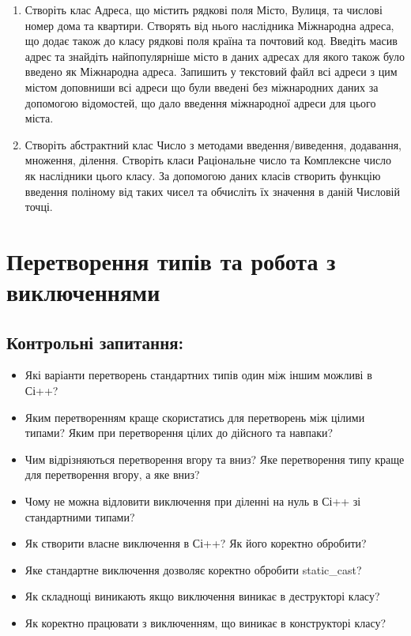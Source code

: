 \documentclass[a5paper,titlepage,openany,twoside,draft]{book_unv}%
\begin{document}
\begin{enumerate}
\item
Створіть клас Адреса, що містить рядкові поля Місто, Вулиця, та числові номер дома та квартири. 
Створять від нього наслідника Міжнародна адреса, що додає також до класу рядкові поля країна та почтовий код.
Введіть масив адрес та знайдіть найпопулярніше місто в даних адресах для якого також було введено як Міжнародна адреса. 
Запишить у текстовий файл всі адреси з цим містом доповниши всі адреси що були введені без міжнародних даних
за допомогою відомостей, що дало введення міжнародної адреси для цього міста.

\item
Створіть абстрактний клас Число з методами введення/виведення, додавання, множення, ділення.
Створіть класи Раціональне число та Комплексне число як наслідники цього класу. 
За допомогою даних класів створить функцію введення поліному від таких чисел
та обчисліть їх значення в даній Числовій точці.


\end{enumerate}


\chapter{Перетворення типів та робота з виключеннями}
%

\section{Контрольні запитання:}
\begin{itemize}
\item
  Які варіанти перетворень стандартних типів один між іншим можливі в
  Сі++?
\item
  Яким перетворенням краще скористатись для перетворень між цілими
  типами? Яким при перетворення цілих до дійсного та навпаки?
\item
  Чим відрізняються перетворення вгору та вниз? Яке перетворення типу
  краще для перетворення вгору, а яке вниз?
\item
  Чому не можна відловити виключення при діленні на нуль в Сі++ зі
  стандартними типами?
\item
  Як створити власне виключення в Сі++? Як його коректно обробити?
\item
  Яке стандартне виключення дозволяє коректно обробити static\_cast?
\item
  Як складнощі виникають якщо виключення виникає в деструкторі класу?
\item
  Як коректно працювати з виключенням, що виникає в конструкторі класу?
\end{itemize}
\end{document}
